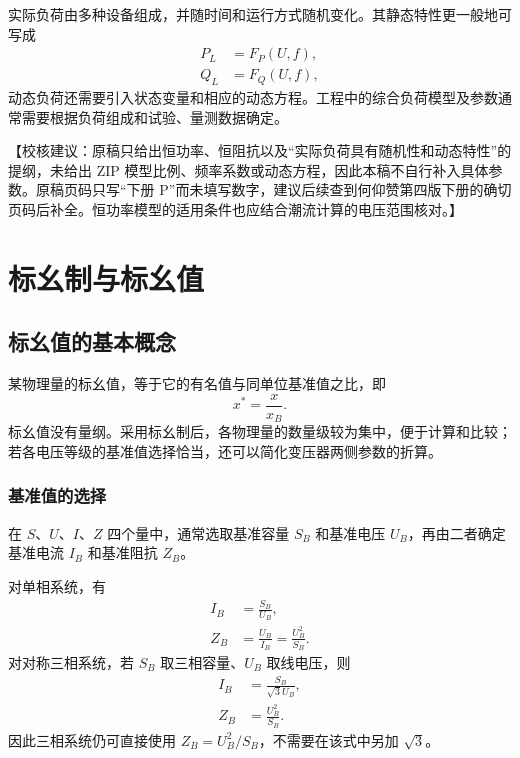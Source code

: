 \documentclass[
  12pt,
  UTF8,
  a4paper,
  fontset=fandol,
  oneside,
  openany
]{ctexrep}
\newcommand{\reviewnote}[1]{%
  \par\smallskip
  {\color{reviewgray}\small\noindent【校核建议：#1】\par}
  \smallskip
}
\begin{document}
实际负荷由多种设备组成，并随时间和运行方式随机变化。其静态特性更一般地可写成
\begin{align}
  P_L & =F_P(U,f), \\
  Q_L & =F_Q(U,f),
\end{align}
动态负荷还需要引入状态变量和相应的动态方程。工程中的综合负荷模型及参数通常需要根据负荷组成和试验、量测数据确定。

\reviewnote{原稿只给出恒功率、恒阻抗以及“实际负荷具有随机性和动态特性”的提纲，未给出 ZIP 模型比例、频率系数或动态方程，因此本稿不自行补入具体参数。原稿页码只写“下册 P”而未填写数字，建议后续查到何仰赞第四版下册的确切页码后补全。恒功率模型的适用条件也应结合潮流计算的电压范围核对。}

\chapter{标幺制与标幺值}

\section{标幺值的基本概念}

某物理量的标幺值，等于它的有名值与同单位基准值之比，即
\begin{equation}
  x^*=\frac{x}{x_B}.
\end{equation}
标幺值没有量纲。采用标幺制后，各物理量的数量级较为集中，便于计算和比较；若各电压等级的基准值选择恰当，还可以简化变压器两侧参数的折算。

\subsection{基准值的选择}

在 $S$、$U$、$I$、$Z$ 四个量中，通常选取基准容量 $S_B$ 和基准电压 $U_B$，再由二者确定基准电流 $I_B$ 和基准阻抗 $Z_B$。

对单相系统，有
\begin{align}
  I_B & =\frac{S_B}{U_B}, \\
  Z_B & =\frac{U_B}{I_B}=\frac{U_B^2}{S_B}.
\end{align}
对对称三相系统，若 $S_B$ 取三相容量、$U_B$ 取线电压，则
\begin{align}
  I_B & =\frac{S_B}{\sqrt{3}U_B}, \\
  Z_B & =\frac{U_B^2}{S_B}.
\end{align}
因此三相系统仍可直接使用 $Z_B=U_B^2/S_B$，不需要在该式中另加 $\sqrt{3}$。
\end{document}
